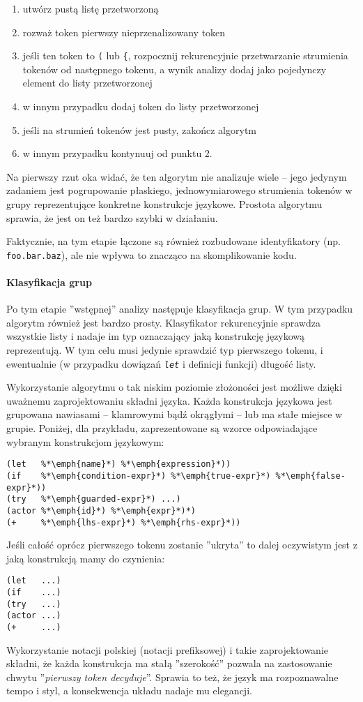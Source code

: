 \begin{enumerate}
    \item utwórz pustą listę przetworzoną
    \item rozważ token pierwszy nieprzenalizowany token
    \item jeśli ten token to \texttt{(} lub \texttt{\{}, rozpocznij rekurencyjnie przetwarzanie strumienia
        tokenów od następnego tokenu, a wynik analizy dodaj jako pojedynczy element do listy przetworzonej
    \item w innym przypadku dodaj token do listy przetworzonej
    \item jeśli na strumień tokenów jest pusty, zakończ algorytm
    \item w innym przypadku kontynuuj od punktu 2.
\end{enumerate}

Na pierwszy rzut oka widać, że ten algorytm nie analizuje wiele -- jego jedynym zadaniem jest pogrupowanie
płaskiego, jednowymiarowego strumienia tokenów w grupy reprezentujące konkretne konstrukcje językowe. Prostota
algorytmu sprawia, że jest on też bardzo szybki w działaniu.

Faktycznie, na tym etapie łączone są również rozbudowane identyfikatory (np. \texttt{foo.bar.baz}), ale nie
wpływa to znacząco na skomplikowanie kodu.

\paragraph*{Klasyfikacja grup}
Po tym etapie ''wstępnej'' analizy następuje klasyfikacja grup. W tym przypadku algorytm również jest bardzo
prosty. Klasyfikator rekurencyjnie sprawdza wszystkie listy i nadaje im typ oznaczający jaką konstrukcję
językową reprezentują. W tym celu musi jedynie sprawdzić typ pierwszego tokenu, i ewentualnie (w przypadku
dowiązań \emph{\texttt{let}} i definicji funkcji) długość listy.

Wykorzystanie algorytmu o tak niskim poziomie złożoności jest możliwe dzięki uważnemu zaprojektowaniu składni
języka. Każda konstrukcja językowa jest grupowana nawiasami -- klamrowymi bądź okrągłymi -- lub ma stałe
miejsce w grupie. Poniżej, dla przykładu, zaprezentowane są wzorce odpowiadające wybranym konstrukcjom
językowym:
\begin{lstlisting}
(let   %*\emph{name}*) %*\emph{expression}*))
(if    %*\emph{condition-expr}*) %*\emph{true-expr}*) %*\emph{false-expr}*))
(try   %*\emph{guarded-expr}*) ...)
(actor %*\emph{id}*) %*\emph{expr}*)*)
(+     %*\emph{lhs-expr}*) %*\emph{rhs-expr}*))
\end{lstlisting}

Jeśli całość oprócz pierwszego tokenu zostanie ''ukryta'' to dalej oczywistym jest z jaką konstrukcją mamy do
czynienia:
\begin{lstlisting}
(let   ...)
(if    ...)
(try   ...)
(actor ...)
(+     ...)
\end{lstlisting}

Wykorzystanie notacji polskiej (notacji prefiksowej) i takie zaprojektowanie składni, że każda konstrukcja ma
stałą ''szerokość'' pozwala na zastosowanie chwytu ''\emph{pierwszy token decyduje}''. Sprawia to też, że
język ma rozpoznawalne tempo i styl, a konsekwencja układu nadaje mu elegancji.
